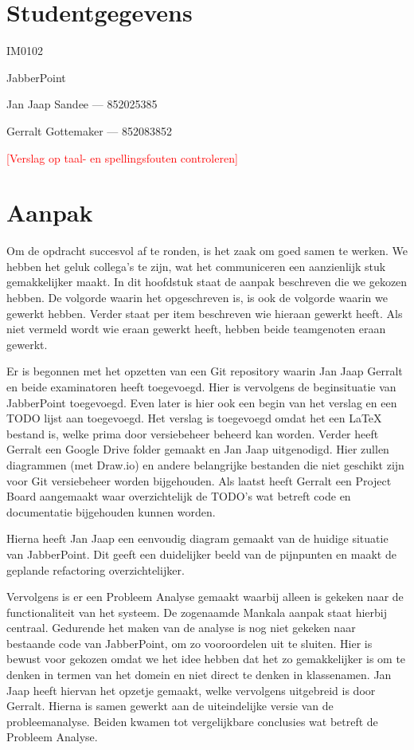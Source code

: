 \documentclass[a4paper]{article}
\newcommand{\todo}[1]{\textcolor{red}{[#1]}}
\newcommand{\1}[0]{\'{e}\'{e}n}
\begin{document}
\pagestyle{fancy}

\section*{Studentgegevens}
\begin{description}
	\item [Cursuscode] IM0102
	\item JabberPoint
    \item Jan Jaap Sandee --- 852025385
	\item Gerralt Gottemaker --- 852083852
\end{description}
\todo{Verslag op taal- en spellingsfouten controleren}

\section*{Aanpak}
Om de opdracht succesvol af te ronden, is het zaak om goed samen te werken. We hebben het geluk collega's te zijn, wat het communiceren een aanzienlijk stuk gemakkelijker maakt. In dit hoofdstuk staat de aanpak beschreven die we gekozen hebben. De volgorde waarin het opgeschreven is, is ook de volgorde waarin we gewerkt hebben. Verder staat per item beschreven wie hieraan gewerkt heeft. Als niet vermeld wordt wie eraan gewerkt heeft, hebben beide teamgenoten eraan gewerkt.

Er is begonnen met het opzetten van een Git repository waarin Jan Jaap Gerralt en beide examinatoren heeft toegevoegd. Hier is vervolgens de beginsituatie van JabberPoint toegevoegd. Even later is hier ook een begin van het verslag en een TODO lijst aan toegevoegd. Het verslag is toegevoegd omdat het een LaTeX bestand is, welke prima door versiebeheer beheerd kan worden. Verder heeft Gerralt een Google Drive folder gemaakt en Jan Jaap uitgenodigd. Hier zullen diagrammen (met Draw.io) en andere belangrijke bestanden die niet geschikt zijn voor Git versiebeheer worden bijgehouden. Als laatst heeft Gerralt een Project Board aangemaakt waar overzichtelijk de TODO's wat betreft code en documentatie bijgehouden kunnen worden.

Hierna heeft Jan Jaap een eenvoudig diagram gemaakt van de huidige situatie van JabberPoint. Dit geeft een duidelijker beeld van de pijnpunten en maakt de geplande refactoring overzichtelijker.

Vervolgens is er een Probleem Analyse gemaakt waarbij alleen is gekeken naar de
functionaliteit van het systeem. De zogenaamde Mankala aanpak staat hierbij
centraal. Gedurende het maken van de analyse is nog niet gekeken naar bestaande
code van JabberPoint, om zo vooroordelen uit te sluiten. Hier is bewust voor
gekozen omdat we het idee hebben dat het zo gemakkelijker is om te denken in
termen van het domein en niet direct te denken in klassenamen. Jan Jaap heeft
hiervan het opzetje gemaakt, welke vervolgens uitgebreid is door Gerralt. Hierna
is samen gewerkt aan de uiteindelijke versie van de probleemanalyse. Beiden
kwamen tot vergelijkbare conclusies wat betreft de Probleem Analyse.
\end{document}
